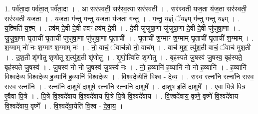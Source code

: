 \documentclass[17pt]{extarticle}
\begin{document}
1. पर्व॑ता॒दा पर्व॑ता॒त् पर्व॑ता॒दा । . आ सर॑स्वती॒ सर॑स्व॒त्या सर॑स्वती । . सर॑स्वती यज॒ता य॑ज॒ता सर॑स्वती॒ सर॑स्वती यज॒ता । . य॒ज॒ता ग॑न्तु गन्तु यज॒ता य॑ज॒ता ग॑न्तु । . ग॒न्तु॒ य॒ज्ञ्ं ॅय॒ज्ञ्म् ग॑न्तु गन्तु य॒ज्ञ्म् । . य॒ज्ञ्मिति॑ य॒ज्ञ्म् । . हव॑म् दे॒वी दे॒वी हवꣳ॒॒ हव॑म् दे॒वी । . दे॒वी जु॑जुषा॒णा जु॑जुषा॒णा दे॒वी दे॒वी जु॑जुषा॒णा । . जु॒जु॒षा॒णा घृ॒ताची॑ घृ॒ताची॑ जुजुषा॒णा जु॑जुषा॒णा घृ॒ताची᳚ । . घृ॒ताची॑ श॒ग्माꣳ श॒ग्माम् घृ॒ताची॑ घृ॒ताची॑ श॒ग्माम् । . श॒ग्माम् नो॑ नः श॒ग्माꣳ श॒ग्माम् नः॑ । . नो॒ वाचं॒ ॅवाच॑न्नो नो॒ वाच᳚म् । . वाच॑ मुश॒ त्यु॑श॒ती वाचं॒ ॅवाच॑ मुश॒ती । . उ॒श॒ती शृ॑णोतु शृणोतू श॒त्यु॑श॒ती शृ॑णोतु । . शृ॒णो॒त्विति॑ शृणोतु । . बृह॑स्पते जु॒षस्व॑ जु॒षस्व॒ बृह॑स्पते॒ बृह॑स्पते जु॒षस्व॑ । . जु॒षस्व॑ नो नो जु॒षस्व॑ जु॒षस्व॑ नः । . नो॒ ह॒व्यानि॑ ह॒व्यानि॑ नो नो ह॒व्यानि॑ । . ह॒व्यानि॑ विश्वदेव्य विश्वदेव्य ह॒व्यानि॑ ह॒व्यानि॑ विश्वदेव्य । . वि॒श्व॒दे॒व्येति॑ विश्व - दे॒व्य॒ । . रास्व॒ रत्ना॑नि॒ रत्ना॑नि॒ रास्व॒ रास्व॒ रत्ना॑नि । . रत्ना॑नि दा॒शुषे॑ दा॒शुषे॒ रत्ना॑नि॒ रत्ना॑नि दा॒शुषे᳚ । . दा॒शुष॒ इति॑ दा॒शुषे᳚ । . ए॒वा पि॒त्रे पि॒त्र ए॒वैवा पि॒त्रे । . पि॒त्रे वि॒श्वदे॑वाय वि॒श्वदे॑वाय पि॒त्रे पि॒त्रे वि॒श्वदे॑वाय । . वि॒श्वदे॑वाय॒ वृष्णे॒ वृष्णे॑ वि॒श्वदे॑वाय वि॒श्वदे॑वाय॒ वृष्णे᳚ । . वि॒श्वदे॑वा॒येति॑ वि॒श्व - दे॒वा॒य॒ । \newline
\end{document}

